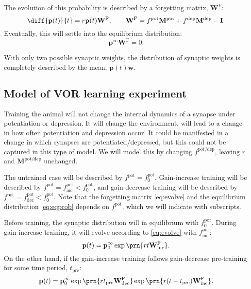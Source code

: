 \documentclass[12pt]{article}
\newcommand{\I}{\mathbf{I}}
\newcommand{\pr}{\mathbf{p}}
\newcommand{\eq}{\pr^\infty}
\newcommand{\w}{\mathbf{w}}
\newcommand{\W}{\mathbf{W}}
\newcommand{\frg}{\W^\mathrm{F}}
\newcommand{\M}{\mathbf{M}}
\newcommand{\pot}{^{\text{pot}}}
\newcommand{\dep}{^{\text{dep}}}
\newcommand{\potdep}{^{\text{pot/dep}}}
\newcommand{\norm}{_0}
\newcommand{\inc}{_{\text{inc}}}
\newcommand{\dec}{_{\text{dec}}}
\newcommand{\tpre}{t_{\text{pre}}}
\begin{document}
The evolution of this probability is described by a forgetting matrix, $\frg$:
%
\begin{equation}\label{eq:evolve}
  \diff{\pr(t)}{t} = r\pr(t)\frg,
  \qquad
  \frg = f\pot\M\pot+f\dep\M\dep-\I.
\end{equation}
%
Eventually, this will settle into the equilibrium distribution:
%
\begin{equation}\label{eq:eqprob}
  \eq\frg=0.
\end{equation}
%



With only two possible synaptic weights, the distribution of synaptic weights is completely described by the mean, $\pr(t)\w$.


\subsection{Model of VOR learning experiment}\label{sec:learning}

Training the animal will not change the internal dynamics of a synapse under potentiation or depression.
It will change the environment, will lead to a change in how often potentiation and depression occur.
It could be manifested in a change in which synapses are potentiated/depressed, but this could not be captured in this type of model.
We will model this by changing $f\potdep$, leaving $r$ and $\M\potdep$ unchanged.

The untrained case will be described by $f\pot=f\pot\norm$.
Gain-increase training  will be described by $f\pot=f\pot\inc<f\pot\norm$, and
gain-decrease training  will be described by $f\pot=f\pot\dec<f\pot\norm$. Note that the forgetting matrix \eqref{eq:evolve} and the equilibrium distribution \eqref{eq:eqprob} depends on $f\pot$, which we will indicate with subscripts.

Before training, the synaptic distribution will in equilibrium with $f\pot\norm$.
During gain-increase training, it will evolve according to \eqref{eq:evolve} with $f\pot\inc$:
%
\begin{equation}\label{eq:nopre}
  \pr(t) = \eq\norm \exp\prn{rt\frg\inc}.
\end{equation}
%
On the other hand, if the gain-increase training follows gain-decrease pre-training for some time period, $\tpre$:
%
\begin{equation}\label{eq:withpre}
  \pr(t) = \eq\norm \exp\prn{r\tpre\frg\dec} \exp\prn{r(t-\tpre)\frg\inc}.
\end{equation}
%
\end{document}
